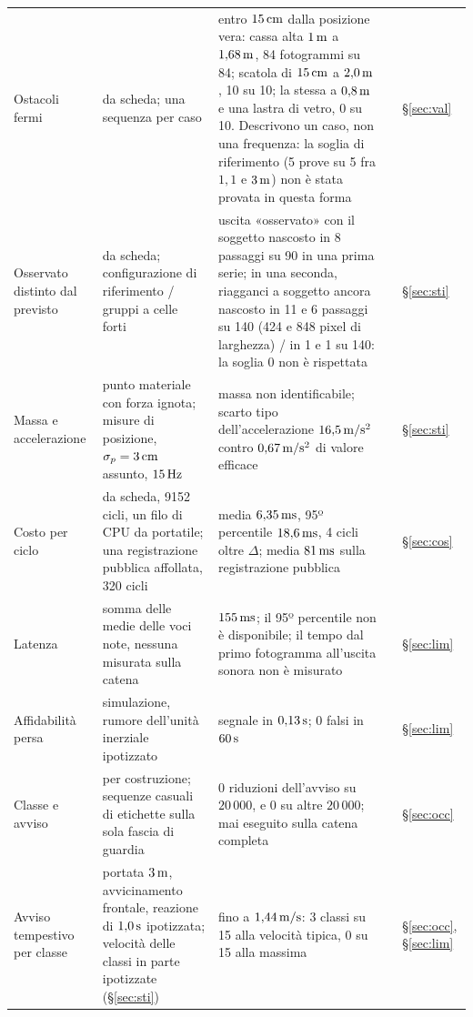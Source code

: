 \begin{table}[p]
\begin{tabularx}{\textwidth}{@{}>{\RaggedRight\arraybackslash}p{2.8cm}>{\RaggedRight\arraybackslash}p{4.1cm}L>{\RaggedRight\arraybackslash}p{1.2cm}>{\RaggedRight\arraybackslash}p{1.05cm}@{}}
Ostacoli fermi & da scheda; una sequenza per caso & entro $15\,\mathrm{cm}$ dalla posizione vera: cassa alta $1\,\mathrm{m}$ a $1{,}68\,\mathrm{m}$, 84 fotogrammi su 84; scatola di $15\,\mathrm{cm}$ a $2{,}0\,\mathrm{m}$, 10 su 10; la stessa a $0{,}8\,\mathrm{m}$ e una lastra di vetro, 0 su 10. Descrivono un caso, non una frequenza: la soglia di riferimento (5 prove su 5 fra $1{,}1$ e $3\,\mathrm{m}$) non è stata provata in questa forma &  & \S\ref{sec:val}\\
Osservato distinto dal previsto & da scheda; configurazione di riferimento / gruppi a celle forti & uscita «osservato» con il soggetto nascosto in 8 passaggi su 90 in una prima serie; in una seconda, riagganci a soggetto ancora nascosto in 11 e 6 passaggi su 140 (424 e 848 pixel di larghezza) / in 1 e 1 su 140: la soglia 0 non è rispettata &  & \S\ref{sec:sti}\\
Massa e accelerazione & punto materiale con forza ignota; misure di posizione, $\sigma_p=3\,\mathrm{cm}$ assunto, $15\,\mathrm{Hz}$ & massa non identificabile; scarto tipo dell'accelerazione $16{,}5\,\mathrm{m/s^2}$ contro $0{,}67\,\mathrm{m/s^2}$ di valore efficace &  & \S\ref{sec:sti}\\
Costo per ciclo & da scheda, 9152 cicli, un filo di CPU da portatile; una registrazione pubblica affollata, 320 cicli & media $6{,}35\,\mathrm{ms}$, 95º percentile $18{,}6\,\mathrm{ms}$, 4 cicli oltre $\Delta$; media $81\,\mathrm{ms}$ sulla registrazione pubblica &  & \S\ref{sec:cos}\\
Latenza & somma delle medie delle voci note, nessuna misurata sulla catena & $155\,\mathrm{ms}$; il 95º percentile non è disponibile; il tempo dal primo fotogramma all'uscita sonora non è misurato &  & \S\ref{sec:lim}\\
Affidabilità persa & simulazione, rumore dell'unità inerziale ipotizzato & segnale in $0{,}13\,\mathrm{s}$; 0 falsi in $60\,\mathrm{s}$ &  & \S\ref{sec:lim}\\
Classe e avviso & per costruzione; sequenze casuali di etichette sulla sola fascia di guardia & 0 riduzioni dell'avviso su $20\,000$, e 0 su altre $20\,000$; mai eseguito sulla catena completa &  & \S\ref{sec:occ}\\
Avviso tempestivo per classe & portata $3\,\mathrm{m}$, avvicinamento frontale, reazione di $1{,}0\,\mathrm{s}$ ipotizzata; velocità delle classi in parte ipotizzate (\S\ref{sec:sti}) & fino a $1{,}44\,\mathrm{m/s}$: 3 classi su 15 alla velocità tipica, 0 su 15 alla massima &  & \S\ref{sec:occ}, \S\ref{sec:lim}\\

\end{tabularx}
\end{table}
